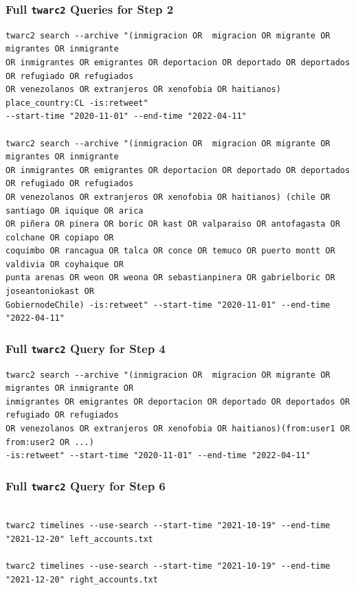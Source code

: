     \subsubsection{Full \texttt{twarc2} Queries for Step 2}\label{appsec_twarc_query2}
        \begin{verbatim}
twarc2 search --archive "(inmigracion OR  migracion OR migrante OR migrantes OR inmigrante 
OR inmigrantes OR emigrantes OR deportacion OR deportado OR deportados OR refugiado OR refugiados 
OR venezolanos OR extranjeros OR xenofobia OR haitianos) place_country:CL -is:retweet" 
--start-time "2020-11-01" --end-time "2022-04-11" 

twarc2 search --archive "(inmigracion OR  migracion OR migrante OR migrantes OR inmigrante 
OR inmigrantes OR emigrantes OR deportacion OR deportado OR deportados OR refugiado OR refugiados 
OR venezolanos OR extranjeros OR xenofobia OR haitianos) (chile OR santiago OR iquique OR arica 
OR piñera OR pinera OR boric OR kast OR valparaiso OR antofagasta OR colchane OR copiapo OR 
coquimbo OR rancagua OR talca OR conce OR temuco OR puerto montt OR valdivia OR coyhaique OR 
punta arenas OR weon OR weona OR sebastianpinera OR gabrielboric OR joseantoniokast OR 
GobiernodeChile) -is:retweet" --start-time "2020-11-01" --end-time "2022-04-11"
        \end{verbatim}
        
    \subsubsection{Full \texttt{twarc2} Query for Step 4}\label{appsec_twarc_query4}
        \begin{verbatim}
twarc2 search --archive "(inmigracion OR  migracion OR migrante OR migrantes OR inmigrante OR 
inmigrantes OR emigrantes OR deportacion OR deportado OR deportados OR refugiado OR refugiados 
OR venezolanos OR extranjeros OR xenofobia OR haitianos)(from:user1 OR from:user2 OR ...) 
-is:retweet" --start-time "2020-11-01" --end-time "2022-04-11"
        \end{verbatim}
        

        
    \subsubsection{Full \texttt{twarc2} Query for Step 6}\label{appsec_twarc_query6}
        \begin{verbatim}

twarc2 timelines --use-search --start-time "2021-10-19" --end-time "2021-12-20" left_accounts.txt

twarc2 timelines --use-search --start-time "2021-10-19" --end-time "2021-12-20" right_accounts.txt   
        \end{verbatim}
        
